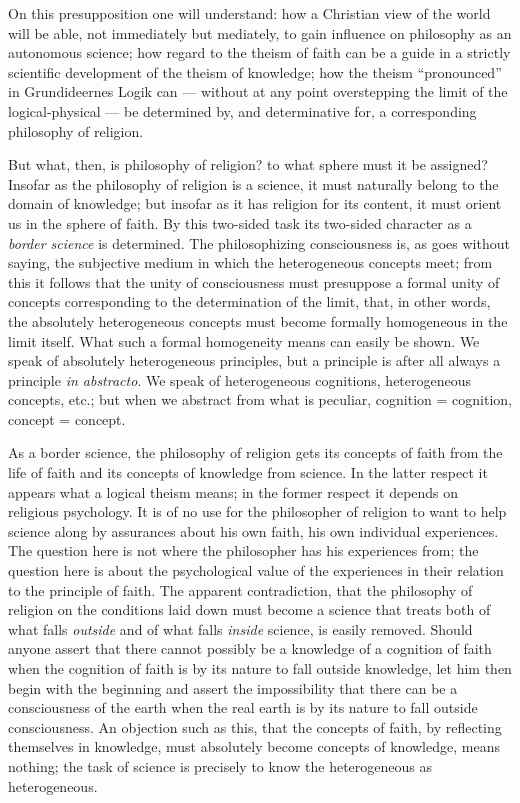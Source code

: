 \documentclass[12pt]{book}
\newcommand{\opage}[1]{\marginnote{\footnotesize\textit{[#1]}}}
\begin{document}
On this presupposition one will understand: how a Christian view of the world will be able, not immediately but mediately, to gain influence on philosophy as an autonomous science; how regard to the theism of faith can be a guide in a strictly scientific development of the theism of knowledge; how the theism ``pronounced'' in Grundideernes Logik can --- without at any point overstepping the limit of the logical-physical --- be determined by, and determinative for, a corresponding philosophy of religion.

But what, then, is philosophy of religion? to what sphere must it be assigned? Insofar as the philosophy of religion is a science, it must naturally belong to the domain of knowledge; but insofar as it has religion for its content, it must orient us in the sphere of faith. By this two-sided task its two-sided character as a \emph{border science} is determined. The philosophizing consciousness is, as goes without saying, the subjective medium in which the heterogeneous concepts meet; from this it follows that the unity of consciousness must presuppose a formal unity of concepts corresponding to the determination of the limit, that, in other words, the absolutely heterogeneous concepts must become formally homogeneous in the limit itself. What such a formal homogeneity means can easily be shown. We speak of absolutely heterogeneous principles, but a principle is
\opage{137}\setcounter{footnote}{0}%
after all always a principle \textit{in abstracto}. We speak of heterogeneous cognitions, heterogeneous concepts, etc.; but when we abstract from what is peculiar, cognition = cognition, concept = concept.

As a border science, the philosophy of religion gets its concepts of faith from the life of faith and its concepts of knowledge from science. In the latter respect it appears what a logical theism means; in the former respect it depends on religious psychology. It is of no use for the philosopher of religion to want to help science along by assurances about his own faith, his own individual experiences. The question here is not where the philosopher has his experiences from; the question here is about the psychological value of the experiences in their relation to the principle of faith. The apparent contradiction, that the philosophy of religion on the conditions laid down must become a science that treats both of what falls \emph{outside} and of what falls \emph{inside} science, is easily removed. Should anyone assert that there cannot possibly be a knowledge of a cognition of faith when the cognition of faith is by its nature to fall outside knowledge, let him then begin with the beginning and assert the impossibility that there can be a consciousness of the earth when the real earth is by its nature to fall outside consciousness. An objection such as this, that the concepts of faith, by reflecting themselves in knowledge, must absolutely become concepts of knowledge, means nothing; the task of science is precisely to know the heterogeneous as heterogeneous.
\end{document}
